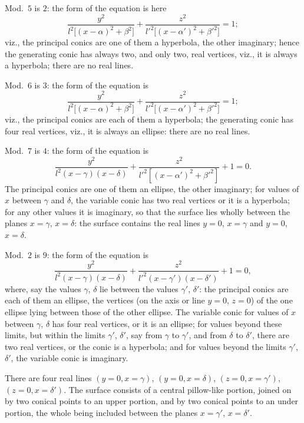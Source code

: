 \documentclass[11pt,a4paper]{article}
\begin{document}
\medskip

Mod.\ $5$ is $2$: the form of the equation is here
\[
\frac{y^2}{l^2\bigl[(x - \alpha)^2 + \beta^2\bigr]}
+ \frac{z^2}{l'^2\bigl[(x - \alpha')^2 + \beta'^2\bigr]} = 1;
\]
viz., the principal conics are one of them a hyperbola, the other
imaginary; hence the generating conic has always two, and only two, real
vertices, viz., it is always a hyperbola; there are no real lines.

\medskip
Mod.\ $6$ is $3$: the form of the equation is
\[
\frac{y^2}{l^2\bigl[(x - \alpha)^2 + \beta^2\bigr]}
+ \frac{z^2}{l'^2\bigl[(x - \alpha')^2 + \beta'^2\bigr]} = 1;
\]
viz., the principal conics are each of them a hyperbola; the generating
conic has four real vertices, viz., it is always an ellipse: there are
no real lines.

\medskip
Mod.\ $7$ is $4$: the form of the equation is
\[
\frac{y^2}{l^2(x - \gamma)(x - \delta)} + \frac{z^2}{l'^2[(x - \alpha')^2 + \beta'^2]} + 1 = 0.
\]
The principal conics are one of them an ellipse, the other imaginary;
for values of $x$ between $\gamma$ and $\delta$, the variable conic has
two real vertices or it is a hyperbola; for any other values it is
imaginary, so that the surface lies wholly between the planes $x = \gamma$,
$x = \delta$: the surface contains the real lines $y = 0$, $x = \gamma$
and $y = 0$, $x = \delta$.

\medskip
Mod.\ $2$ is $9$: the form of the equation is
\[
\frac{y^2}{l^2(x - \gamma)(x - \delta)} + \frac{z^2}{l'^2(x - \gamma')(x - \delta')} + 1 = 0,
\]
where, say the values $\gamma$, $\delta$ lie between the values
$\gamma'$, $\delta'$: the principal conics are each of them an ellipse,
the vertices (on the axis or line $y = 0$, $z = 0$) of the one ellipse
lying between those of the other ellipse. The variable conic for values
of $x$ between $\gamma$, $\delta$ has four real vertices, or it is an
ellipse; for values beyond these limits, but within the limits $\gamma'$,
$\delta'$, say from $\gamma$ to $\gamma'$, and from $\delta$ to $\delta'$,
there are two real vertices, or the conic is a hyperbola; and for values
beyond the limits $\gamma'$, $\delta'$, the variable conic is imaginary.

There are four real lines $(y = 0, x = \gamma)$, $(y = 0, x = \delta)$,
$(z = 0, x = \gamma')$, $(z = 0, x = \delta')$. The surface consists of
a central pillow-like portion, joined on by two conical points to an
upper portion, and by two conical points to an under portion, the whole
being included between the planes $x = \gamma'$, $x = \delta'$.
\end{document}
